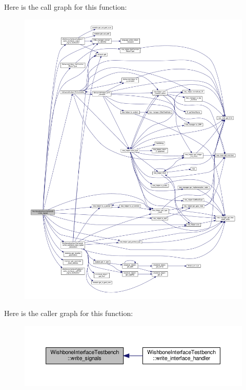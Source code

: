 Here is the call graph for this function\+:
\nopagebreak
\begin{figure}[H]
\begin{center}
\leavevmode
\includegraphics[width=350pt]{de/ded/classWishboneInterfaceTestbench_af319e1ea1cb928d2d4ce67815622b62e_cgraph}
\end{center}
\end{figure}
Here is the caller graph for this function\+:
\nopagebreak
\begin{figure}[H]
\begin{center}
\leavevmode
\includegraphics[width=350pt]{de/ded/classWishboneInterfaceTestbench_af319e1ea1cb928d2d4ce67815622b62e_icgraph}
\end{center}
\end{figure}
\mbox{\label{classWishboneInterfaceTestbench_ae87e0398c62bdaa30f68d492a07e7cdc}} 
